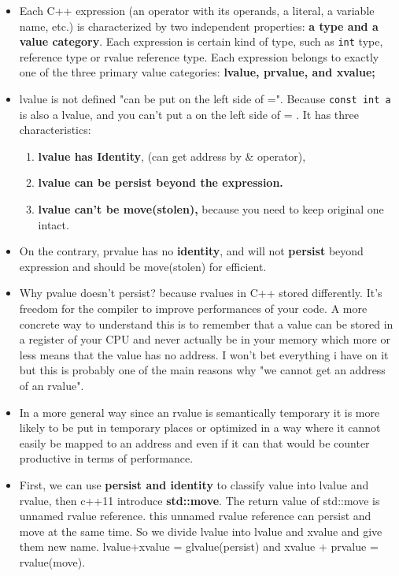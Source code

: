 \documentclass[a4paper,11pt,twoside]{book}
\begin{document}
\begin{itemize}
	\item Each C++ expression (an operator with its operands, a literal, a variable name, etc.) is characterized by two independent properties: \textbf{a type and a value category}. Each expression is certain kind of type, such as \texttt{int} type, reference type or rvalue reference type. Each expression belongs to exactly one of the three primary value categories: \textbf{lvalue, prvalue, and xvalue;} 
	
	\item lvalue is not defined "can be put on the left side of =". Because \texttt{const int a} is also a lvalue, and you can't put a on the left side of = . It has three characteristics:
	\begin{enumerate}
		\item\textbf{lvalue has Identity}, (can get address by \& operator),
		\item \textbf{lvalue can be persist beyond the expression. }
		\item \textbf{lvalue can't be move(stolen),} because you need to keep original one intact.
	\end{enumerate}
	
	\item On the contrary, prvalue has no \textbf{identity}, and will not \textbf{persist} beyond expression and should be move(stolen) for efficient.
	
	\item Why pvalue doesn't persist? because rvalues in C++ stored differently. It's freedom for the compiler to improve performances of your code. A more concrete way to understand this is to remember that a value can be stored in a register of your CPU and never actually be in your memory which more or less means that the value has no address. I won't bet everything i have on it but this is probably one of the main reasons why "we cannot get an address of an rvalue".
	
	\item In a more general way since an rvalue is semantically temporary it is more likely to be put in temporary places or optimized in a way where it cannot easily be mapped to an address and even if it can that would be counter productive in terms of performance.
	
	\item First, we can use \textbf{persist and identity} to classify value into lvalue and rvalue, then c++11 introduce \textbf{std::move}. The return value of std::move is unnamed rvalue reference. this unnamed rvalue reference can persist and move at the same time.  So we divide lvalue into lvalue and xvalue and give them new name.  lvalue+xvalue = glvalue(persist)  and xvalue + prvalue = rvalue(move).
	

\end{itemize}
\end{document}
